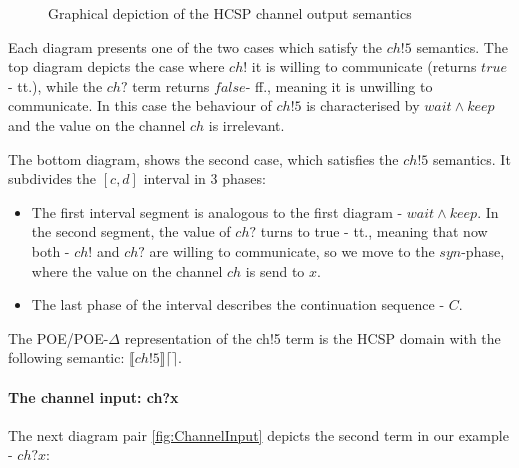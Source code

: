 \documentclass[runningheads,a4paper]{llncs}
\begin{document}
\begin{figure}[hbt]
  \caption{Graphical depiction of the HCSP channel output semantics}
  \label{fig:ChannelOutput}
\end{figure}

Each diagram presents one of the two cases which satisfy the $ch!5$
semantics. The top diagram depicts the case where $ch!$ it is willing to
communicate (returns $true$ - tt.), while the $ch?$ term returns
$false$- ff., meaning it is unwilling to communicate. In this case the behaviour of $ch!5$ is
characterised by $wait \wedge keep$ and the value on the channel $ch$
is irrelevant.

The bottom diagram, shows the second case, which satisfies the $ch!5$
semantics. It subdivides the $[c, d]$ interval in 3 phases:
\begin{itemize}
\item The first interval segment is analogous to the first diagram -
  $wait \wedge keep$. In the second segment, the value
  of $ch?$ turns to true - tt., meaning that now both - $ch!$
  and $ch?$ are willing to communicate, so we move to the $syn$-phase,
  where the value on the channel $ch$ is send to $x$.
\item The last phase of the interval describes the continuation
  sequence - $C$.
\end{itemize}

The POE/POE-$\Delta$ representation of the ch!5 term is the
 HCSP domain with the following semantic: $\llbracket
ch!5\rrbracket \lceil \rceil$.

\paragraph{The channel input: ch?x}
The next diagram pair \ref{fig:ChannelInput} depicts the second term
in our example - $ch?x$:
\end{document}
